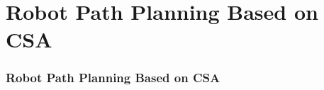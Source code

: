 \section{Robot Path Planning Based on CSA}
\frame
{
\frametitle{Robot Path Planning Based on CSA}
}
